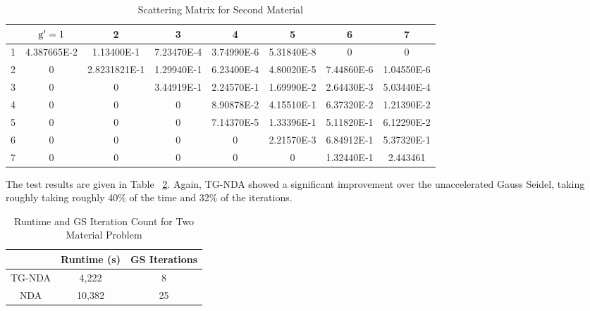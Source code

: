 \begin{table}[H]
\footnotesize
\centering
\caption{Scattering Matrix for Second Material}
\begin{center}
    \begin{tabular}{|c|c|c|c|c|c|c|c|}
\hline
 & $\mathrm{g}'=1$ & 2 & 3 & 4 & 5 & 6 & 7 \\ 
\hline
1 & 4.387665E-2 & 1.13400E-1   &  7.23470E-4 & 3.74990E-6 & 5.31840E-8  &     0    &     0    \\
\hline
2 & 0        &    2.8231821E-1  & 1.29940E-1 & 6.23400E-4 & 4.80020E-5 & 7.44860E-6 & 1.04550E-6 \\
\hline
3 & 0       &        0    &       3.44919E-1 & 2.24570E-1 & 1.69990E-2 & 2.64430E-3 & 5.03440E-4 \\
\hline
4 & 0         &      0      &         0     &  8.90878E-2 & 4.15510E-1 & 6.37320E-2 & 1.21390E-2 \\
\hline
5 & 0     &          0       &        0   &    7.14370E-5 & 1.33396E-1 & 5.11820E-1 & 6.12290E-2 \\
\hline
6 & 0   &        0      &         0   &        0     &  2.21570E-3 & 6.84912E-1 & 5.37320E-1 \\
\hline
7 & 0      &         0        &       0    &       0    &       0    &   1.32440E-1 & 2.443461  \\
\hline
    \end{tabular}
\end{center}
\label{table:mat2}
\end{table}


The test results are given in Table ~\ref{tab:two}. Again, TG-NDA showed a significant improvement over the unaccelerated Gauss Seidel, taking roughly taking roughly 40\% of the time and 32\% of the iterations. 



\begin{table}[!htb]
\centering
\caption{Runtime and GS Iteration Count for Two Material Problem}
    \label{tab:two}
\begin{center}
    \begin{tabular}{|c|c|c|}
    \hline
    & Runtime (s) & GS Iterations \\
    \hline
    TG-NDA & 4,222 & 8 \\
    NDA & 10,382 & 25 \\
    \hline
    \end{tabular}
\end{center}
\end{table}


